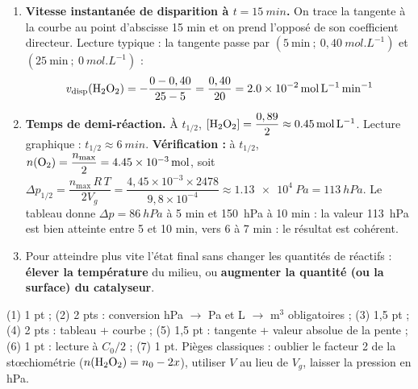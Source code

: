 \documentclass[11pt]{article}
\begin{document}
\begin{corrige}
\begin{enumerate}
\item \textbf{Vitesse instantanée de disparition à $t = \SI{15}{min}$.} On trace la tangente à la courbe au point d'abscisse 15 min et on prend l'opposé de son coefficient directeur. Lecture typique : la tangente passe par $(5\ \text{min}\ ;\ 0,40\ \si{mol.L^{-1}})$ et $(25\ \text{min}\ ;\ 0\ \si{mol.L^{-1}})$ :
\[ v_{\text{disp}}(\ce{H2O2}) = -\frac{0 - 0,40}{25 - 5} = \frac{0,40}{20} = \SI{2,0e-2}{mol.L^{-1}.min^{-1}} \]
\item \textbf{Temps de demi-réaction.} À $t_{1/2}$, $[\ce{H2O2}] = \dfrac{0,89}{2} \approx \SI{0,45}{mol.L^{-1}}$. Lecture graphique : $t_{1/2} \approx \SI{6}{min}$.
\textbf{Vérification :} à $t_{1/2}$, $n(\ce{O2}) = \dfrac{n_{\max}}{2} = \SI{4,45e-3}{mol}$, soit $\Delta p_{1/2} = \dfrac{n_{\max}\,R\,T}{2V_g} = \dfrac{4,45\times 10^{-3}\times 2478}{9,8\times 10^{-4}} \approx \SI{1,13e4}{Pa} = \SI{113}{hPa}$. Le tableau donne $\Delta p = \SI{86}{hPa}$ à 5 min et \SI{150}{hPa} à 10 min : la valeur \SI{113}{hPa} est bien atteinte entre 5 et 10 min, vers 6 à 7 min : le résultat est cohérent.
\item Pour atteindre plus vite l'état final sans changer les quantités de réactifs : \textbf{élever la température} du milieu, ou \textbf{augmenter la quantité (ou la surface) du catalyseur}.
\end{enumerate}
\end{corrige}

\begin{attention}
(1) 1 pt ; (2) 2 pts : conversion hPa $\to$ Pa et L $\to$ m$^3$ obligatoires ; (3) 1,5 pt ; (4) 2 pts : tableau + courbe ; (5) 1,5 pt : tangente + valeur absolue de la pente ; (6) 1 pt : lecture à $C_0/2$ ; (7) 1 pt. Pièges classiques : oublier le facteur 2 de la stœchiométrie ($n(\ce{H2O2}) = n_0 - 2x$), utiliser $V$ au lieu de $V_g$, laisser la pression en hPa.
\end{attention}
\end{document}

